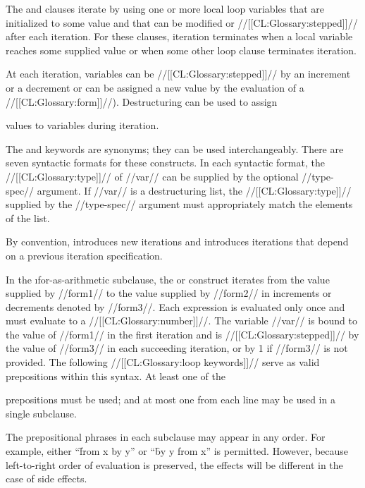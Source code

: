 The  and  clauses iterate by using one or more local  loop  variables that are initialized to some value and that  can be modified or //[[CL:Glossary:stepped]]// after each iteration.   For these clauses, iteration terminates when a local variable reaches some supplied value or when some other loop clause terminates iteration.

At each iteration, variables can be 
   //[[CL:Glossary:stepped]]// by an increment or a decrement or can be assigned a new value by the evaluation of a //[[CL:Glossary:form]]//). Destructuring can be used to assign 

values to variables during iteration. 

The  and  keywords are synonyms; they can be used interchangeably.  There are seven syntactic formats for these constructs. In each syntactic format, the //[[CL:Glossary:type]]// of //var// can be supplied by the optional //type-spec// argument.  If //var// is a destructuring list, the //[[CL:Glossary:type]]// supplied by the //type-spec// argument must appropriately match the elements of the list.  

By convention,  introduces new iterations and  introduces iterations that depend on a previous iteration specification.


In the \i{for-as-arithmetic} subclause, the   or  construct iterates from the value supplied by //form1// to the value supplied by //form2// in increments or decrements denoted by //form3//. Each expression is evaluated only once and must evaluate to a //[[CL:Glossary:number]]//.   The variable //var// is bound to the value of  //form1// in the first iteration and is //[[CL:Glossary:stepped]]// by the value of //form3// in each succeeding iteration, or by 1 if //form3// is not provided.   The following //[[CL:Glossary:loop keywords]]// serve as valid prepositions within this  syntax. At least one of the 

prepositions must be used;  and at most one from each line may be used in a single subclause.

\beginlist                 
   \endlist

 The prepositional phrases in each subclause may appear in any order. For example, either ``\f{from x by y}'' or ``\f{by y from x}'' is permitted. However, because left-to-right order of evaluation is preserved, the effects will be different in the case of side effects. %

